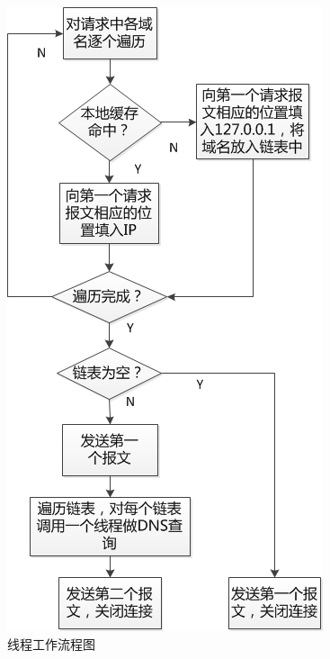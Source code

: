 \begin{figure}[H]
\centering
\includegraphics[keepaspectratio, scale=1]{pitures/xianchengliuchengtu.png}
\caption{线程工作流程图} 
\end{figure}

